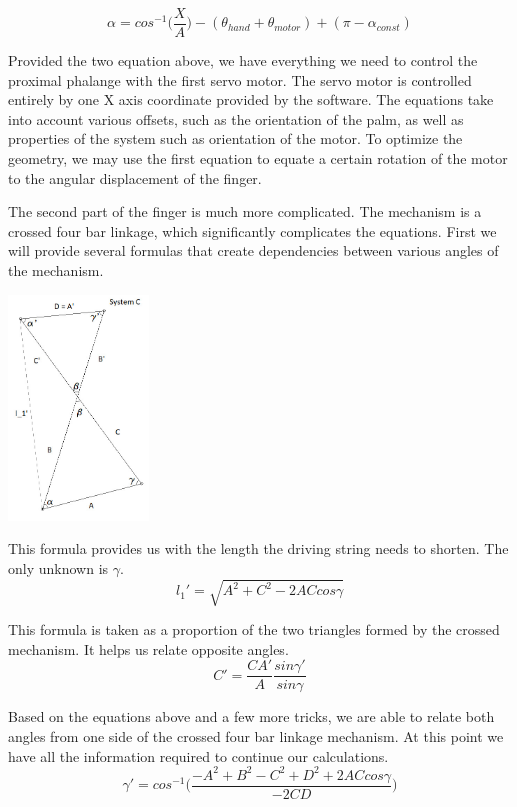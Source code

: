\documentclass{article}
\begin{document}
\[ \alpha = cos^{-1}\bigg(\frac{X}{A}\bigg) - (\theta_{hand} + \theta_{motor}) + (\pi - \alpha_{const}) \]

Provided the two equation above, we have everything we need to control the proximal phalange with the first servo motor. The servo motor is controlled entirely by one X axis coordinate provided by the software. The equations take into account various offsets, such as the orientation of the palm, as well as properties of the system such as orientation of the motor. To optimize the geometry, we may use the first equation to equate a certain rotation of the motor to the angular displacement of the finger.\vspace{12pt}

The second part of the finger is much more complicated. The mechanism is a crossed four bar linkage, which significantly complicates the equations. First we will provide several formulas that create dependencies between various angles of the mechanism.

\begin{center}
\includegraphics[width=0.28\textwidth]{IMG/IK_04.jpeg}
\end{center}


This formula provides us with the length the driving string needs to shorten. The only unknown is $\gamma$.
\[ l_1' = \sqrt{A^2+C^2-2ACcos\gamma}\]

This formula is taken as a proportion of the two triangles formed by the crossed mechanism. It helps us relate opposite angles.
\[ C' = \frac{CA'}{A} \frac{sin\gamma'}{sin\gamma} \]

Based on the equations above and a few more tricks, we are able to relate both angles from one side of the crossed four bar linkage mechanism. At this point we have all the information required to continue our calculations.
\[ \gamma' = cos^{-1}\bigg( \frac{-A^2+B^2-C^2+D^2+2ACcos\gamma}{-2CD} \bigg)\]
\end{document}
